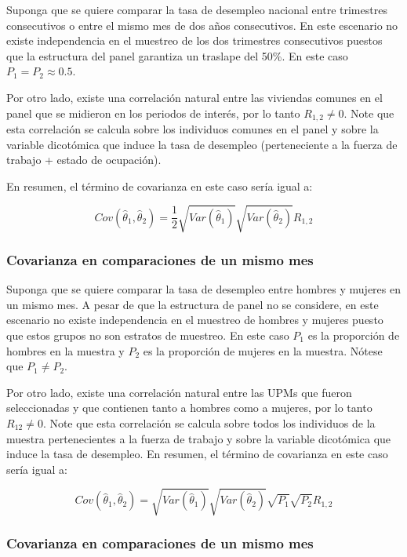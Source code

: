Suponga que se quiere comparar la tasa de desempleo nacional entre trimestres consecutivos o entre el mismo mes de dos años consecutivos. En este escenario no existe independencia en el muestreo de los dos trimestres consecutivos puestos que la estructura del panel garantiza un traslape del 50\%. En este caso \(P_1 = P_2 \approx 0.5\).

Por otro lado, existe una correlación natural entre las viviendas comunes en el panel que se midieron en los periodos de interés, por lo tanto \(R_{1,2} \neq 0\). Note que esta correlación se calcula sobre los individuos comunes en el panel y sobre la variable dicotómica que induce la tasa de desempleo (perteneciente a la fuerza de trabajo + estado de ocupación).

En resumen, el término de covarianza en este caso sería igual a:

\[
Cov(\hat{\theta}_1, \hat{\theta}_2) = \frac{1}{2}\sqrt{Var(\hat{\theta}_1)}\sqrt{Var(\hat{\theta}_2)}R_{1,2}
\]

\hypertarget{covarianza-en-comparaciones-de-un-mismo-mes}{%
\subsubsection*{Covarianza en comparaciones de un mismo mes}\label{covarianza-en-comparaciones-de-un-mismo-mes}}


Suponga que se quiere comparar la tasa de desempleo entre hombres y mujeres en un mismo mes. A pesar de que la estructura de panel no se considere, en este escenario no existe independencia en el muestreo de hombres y mujeres puesto que estos grupos no son estratos de muestreo. En este caso \(P_1\) es la proporción de hombres en la muestra y \(P_2\) es la proporción de mujeres en la muestra. Nótese que \(P_1 \neq P_2\).

Por otro lado, existe una correlación natural entre las UPMs que fueron seleccionadas y que contienen tanto a hombres como a mujeres, por lo tanto \(R_{12} \neq 0\). Note que esta correlación se calcula sobre todos los individuos de la muestra pertenecientes a la fuerza de trabajo y sobre la variable dicotómica que induce la tasa de desempleo. En resumen, el término de covarianza en este caso sería igual a:

\[
Cov(\hat{\theta}_1, \hat{\theta}_2) = \sqrt{Var(\hat{\theta}_1)}\sqrt{Var(\hat{\theta}_2)}\sqrt{P_1}\sqrt{P_2}R_{1,2}
\]

\hypertarget{covarianza-en-comparaciones-de-un-mismo-mes-1}{%
\subsubsection*{Covarianza en comparaciones de un mismo mes}\label{covarianza-en-comparaciones-de-un-mismo-mes-1}}


